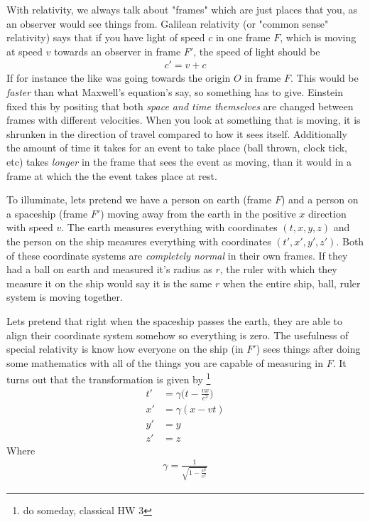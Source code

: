 With relativity, we always talk about "frames" which are just places that you, as an observer would see things from. Galilean relativity (or "common sense" relativity) says that if you have light of speed $c$ in one frame $F$, which is moving at speed $v$ towards an observer in frame $F'$, the speed of light should be 
\begin{align}
    c' = v+ c
\end{align}
If for instance the like was going towards the origin $O$ in frame $F$. This would be \emph{faster} than what Maxwell's equation's say, so something has to give. Einstein fixed this by positing that both \emph{space and time themselves} are changed between frames with different velocities. When you look at something that is moving, it is shrunken in the direction of travel compared to how it sees itself. Additionally the amount of time it takes for an event to take place (ball thrown, clock tick, etc) takes \emph{longer} in the frame that sees the event as moving, than it would in a frame at which the the event takes place at rest. 


To illuminate, lets pretend we have a person on earth (frame $F$) and a person on a spaceship (frame $F'$) moving away from the earth in the positive $x$ direction with speed $v$. The earth measures everything with coordinates $(t,x,y,z)$ and the person on the ship measures everything with coordinates $(t',x',y',z')$. Both of these coordinate systems are \emph{completely normal} in their own frames. If they had a ball on earth and measured it's radius as $r$, the ruler with which they measure it on the ship would say it is the same $r$ when the entire ship, ball, ruler system is moving together. 

Lets pretend that right when the spaceship passes the earth, they are able to align their coordinate system somehow so everything is zero. The usefulness of special relativity is know how everyone on the ship (in $F'$) sees things after doing some mathematics with all of the things you are capable of measuring in $F$. It turns out that the transformation is given by \footnote{do someday, classical HW 3}
\begin{align}\label{lorentzcontract}
    t' &= \gamma\Big(t -\frac{vx}{c^2} \Big)\\
    x' &= \gamma(x - vt)\\
    y' &= y\\
    z' &= z
\end{align}
Where 
\begin{align}
\gamma =\frac{1}{ \sqrt{1-\frac{v^2}{c^2}}  }
\end{align}

